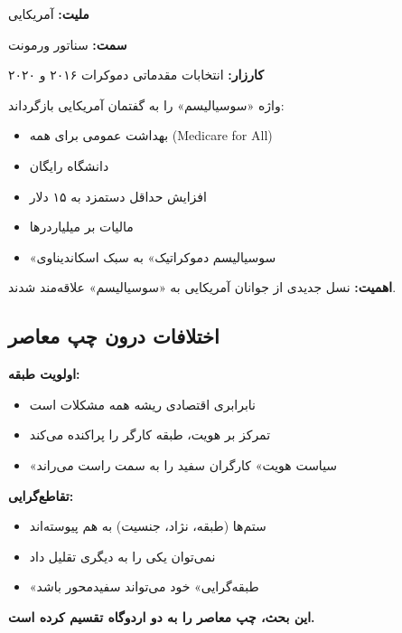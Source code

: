\begin{personbox}

\textbf{ملیت:} آمریکایی

\textbf{سمت:} سناتور ورمونت

\textbf{کارزار:} انتخابات مقدماتی دموکرات ۲۰۱۶ و ۲۰۲۰

\mediumspace

 واژه «سوسیالیسم» را به گفتمان آمریکایی بازگرداند:
\begin{itemize}[nosep]
    \item بهداشت عمومی برای همه (Medicare for All)
    \item دانشگاه رایگان
    \item افزایش حداقل دستمزد به ۱۵ دلار
    \item مالیات بر میلیاردرها
    \item «سوسیالیسم دموکراتیک» به سبک اسکاندیناوی
\end{itemize}

\mediumspace

\textbf{اهمیت:} نسل جدیدی از جوانان آمریکایی به «سوسیالیسم» علاقه‌مند شدند.
\end{personbox}

\subsection{اختلافات درون چپ معاصر}

\begin{debatebox}
\textbf{اولویت طبقه:}
\begin{itemize}[nosep]
    \item نابرابری اقتصادی ریشه همه مشکلات است
    \item تمرکز بر هویت، طبقه کارگر را پراکنده می‌کند
    \item «سیاست هویت» کارگران سفید را به سمت راست می‌راند
\end{itemize}

\textbf{تقاطع‌گرایی:}
\begin{itemize}[nosep]
    \item ستم‌ها (طبقه، نژاد، جنسیت) به هم پیوسته‌اند
    \item نمی‌توان یکی را به دیگری تقلیل داد
    \item «طبقه‌گرایی» خود می‌تواند سفیدمحور باشد
\end{itemize}

\textbf{این بحث، چپ معاصر را به دو اردوگاه تقسیم کرده است.}
\end{debatebox}

